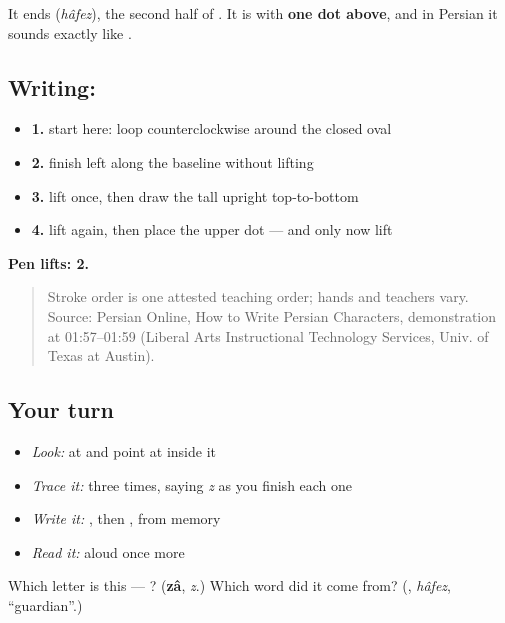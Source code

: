 It ends \textbf{} (\emph{hâfez}), the second half of \textbf{ }. It is \textbf{} with \textbf{one dot above}, and in Persian it sounds exactly like \textbf{}.

\subsection*{Writing: }

\begin{itemize}
\raggedright
  \item \textbf{1.} start here: loop counterclockwise around the closed oval
  \item \textbf{2.} finish left along the baseline without lifting
  \item \textbf{3.} lift once, then draw the tall upright top-to-bottom
  \item \textbf{4.} lift again, then place the upper dot — and only now lift
\end{itemize}

\textbf{Pen lifts: 2.}

\begin{quote}
Stroke order is one attested teaching order; hands and teachers vary. Source: Persian Online, How to Write Persian Characters,  demonstration at 01:57–01:59 (Liberal Arts Instructional Technology Services, Univ. of Texas at Austin).
\end{quote}

\subsection*{Your turn}
\begin{itemize}
\raggedright
  \item \emph{Look:} at \textbf{} and point at  inside it
  \item \emph{Trace it:}  three times, saying \emph{z} as you finish each one
  \item \emph{Write it:} , then , from memory
  \item \emph{Read it:} \textbf{} aloud once more
\end{itemize}

\begin{tcolorbox}[breakable,colback=teal!4,colframe=teal!35!black,title={Before you move on}]
Which letter is this — ? (\textbf{zâ}, \emph{z}.) Which word did it come from? (\textbf{}, \emph{hâfez}, \textquotedblleft{}guardian\textquotedblright{}.)
\end{tcolorbox}
